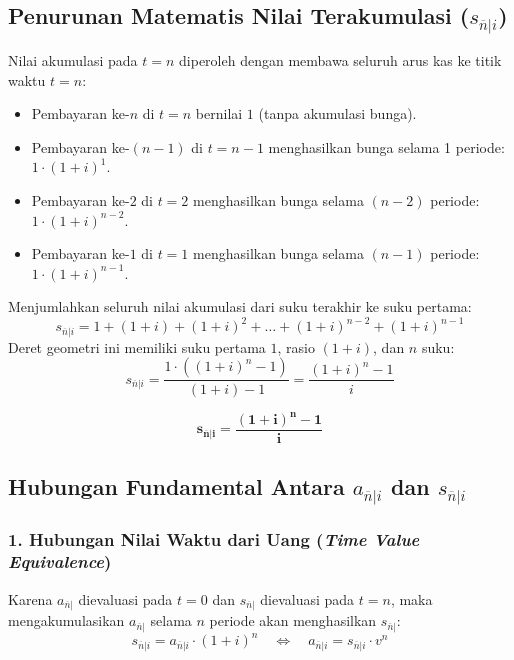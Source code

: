 \documentclass[11pt,a4paper]{article}
\begin{document}
\subsection{Penurunan Matematis Nilai Terakumulasi (\texorpdfstring{$s_{\overline{n}|i}$}{s\_n|i})}

Nilai akumulasi pada $t = n$ diperoleh dengan membawa seluruh arus kas ke titik waktu $t = n$:
\begin{itemize}
    \item Pembayaran ke-$n$ di $t = n$ bernilai $1$ (tanpa akumulasi bunga).
    \item Pembayaran ke-$(n-1)$ di $t = n-1$ menghasilkan bunga selama 1 periode: $1 \cdot (1+i)^1$.
    \item Pembayaran ke-$2$ di $t = 2$ menghasilkan bunga selama $(n-2)$ periode: $1 \cdot (1+i)^{n-2}$.
    \item Pembayaran ke-$1$ di $t = 1$ menghasilkan bunga selama $(n-1)$ periode: $1 \cdot (1+i)^{n-1}$.
\end{itemize}

Menjumlahkan seluruh nilai akumulasi dari suku terakhir ke suku pertama:
\begin{equation}
    s_{\overline{n}|i} = 1 + (1+i) + (1+i)^2 + \dots + (1+i)^{n-2} + (1+i)^{n-1}
\end{equation}
Deret geometri ini memiliki suku pertama $1$, rasio $(1+i)$, dan $n$ suku:
\begin{equation}
    s_{\overline{n}|i} = \frac{1 \cdot \left((1+i)^n - 1\right)}{(1+i) - 1} = \frac{(1+i)^n - 1}{i}
\end{equation}

\begin{definitionbox}
\begin{equation}
    \mathbf{s_{\overline{n}|i} = \frac{(1+i)^n - 1}{i}}
\end{equation}
\end{definitionbox}

\subsection{Hubungan Fundamental Antara \texorpdfstring{$a_{\overline{n}|i}$}{a\_n|i} dan \texorpdfstring{$s_{\overline{n}|i}$}{s\_n|i}}

\subsubsection{1. Hubungan Nilai Waktu dari Uang (\textit{Time Value Equivalence})}
Karena $a_{\overline{n}|}$ dievaluasi pada $t = 0$ dan $s_{\overline{n}|}$ dievaluasi pada $t = n$, maka mengakumulasikan $a_{\overline{n}|}$ selama $n$ periode akan menghasilkan $s_{\overline{n}|}$:
\begin{equation}
    s_{\overline{n}|i} = a_{\overline{n}|i} \cdot (1+i)^n \quad \iff \quad a_{\overline{n}|i} = s_{\overline{n}|i} \cdot v^n
\end{equation}
\end{document}
